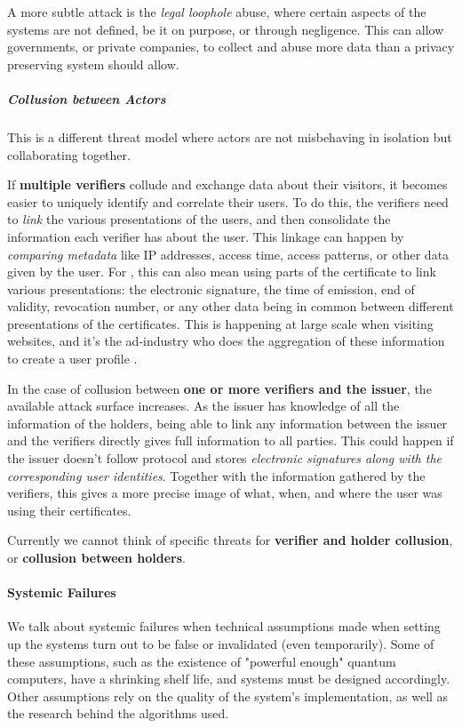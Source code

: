 A more subtle attack is the \emph{legal loophole} abuse, where certain aspects of the systems
are not defined, be it on purpose, or through negligence.
This can allow governments, or private companies, to collect and abuse
more data than a privacy preserving system should allow.

\subparagraph{Collusion between Actors}

This is a different threat model where actors are not misbehaving in isolation but collaborating together.

If \textbf{multiple verifiers} collude and exchange data about their visitors,
it becomes easier to uniquely identify and correlate their users.
To do this, the verifiers need to \emph{link} the various presentations of the users,
and then consolidate the information each verifier has about the user.
This linkage can happen by \emph{comparing metadata} like IP addresses, access
time, access patterns, or other data given by the user.
For \eid, this can also mean using parts of the certificate to link various presentations:
 the electronic signature, the time of emission, end of validity, revocation number,
or any other data being in common between different presentations of the certificates.
This is happening at large scale when visiting websites, and it's the ad-industry who
does the aggregation of these information to create a user profile \cite{BARW16}.

In the case of collusion between \textbf{one or more verifiers and the issuer},
the available attack surface increases.
As the issuer has knowledge of all the information of the holders, being able to
link any information between the issuer and the verifiers directly gives full
information to all parties.
This could happen if the issuer doesn't follow protocol and stores
\emph{electronic signatures along with the corresponding user identities}.
Together with the information gathered by the verifiers, this gives a more precise
image of what, when, and where the user was using their certificates.

Currently we cannot think of specific threats for \textbf{verifier and holder collusion},
or \textbf{collusion between holders}.

\paragraph{Systemic Failures}

We talk about systemic failures when technical assumptions made when setting up the systems turn out to be false or invalidated (even temporarily).
Some of these assumptions, such as the existence of "powerful enough" quantum computers, have a shrinking shelf life, and systems must be designed accordingly.
Other assumptions rely on the quality of the system's implementation, as well as
the research behind the algorithms used.

